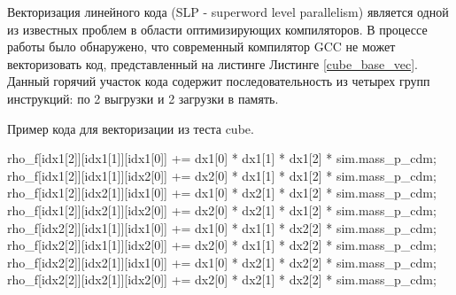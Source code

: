 Векторизация линейного кода (SLP - superword level parallelism) \cite{rosen2007loop,guo2017new} является одной из известных проблем в области оптимизирующих компиляторов.  В процессе работы было обнаружено, что современный компилятор GCC не может векторизовать код, представленный на листинге Листинге \ref{cube_base_vec}.  Данный горячий участок кода содержит последовательность из четырех групп инструкций: по 2  выгрузки и 2 загрузки в память. 

\begin{ListingEnv}[!h]
	\captiondelim{ } %
	\caption{Пример кода для векторизации из теста cube.}\label{cube_base_vec}
	
	\begin{Verb}
		rho_f[idx1[2]][idx1[1]][idx1[0]] +=
			dx1[0] * dx1[1] * dx1[2] * sim.mass_p_cdm;
		rho_f[idx1[2]][idx1[1]][idx2[0]] +=
			dx2[0] * dx1[1] * dx1[2] * sim.mass_p_cdm;
		rho_f[idx1[2]][idx2[1]][idx1[0]] +=
			dx1[0] * dx2[1] * dx1[2] * sim.mass_p_cdm;
		rho_f[idx1[2]][idx2[1]][idx2[0]] +=
			dx2[0] * dx2[1] * dx1[2] * sim.mass_p_cdm;
		rho_f[idx2[2]][idx1[1]][idx1[0]] +=
			dx1[0] * dx1[1] * dx2[2] * sim.mass_p_cdm;
		rho_f[idx2[2]][idx1[1]][idx2[0]] +=
			dx2[0] * dx1[1] * dx2[2] * sim.mass_p_cdm;
		rho_f[idx2[2]][idx2[1]][idx1[0]] +=
			dx1[0] * dx2[1] * dx2[2] * sim.mass_p_cdm;
		rho_f[idx2[2]][idx2[1]][idx2[0]] +=
			dx2[0] * dx2[1] * dx2[2] * sim.mass_p_cdm;
		
	\end{Verb}
\end{ListingEnv}



